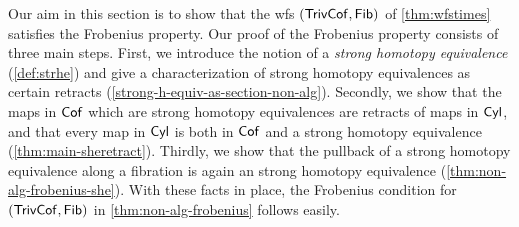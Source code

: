 \documentclass[reqno,10pt,a4paper,oneside,draft]{amsart}
\begin{document}
Our aim in this section is to show that the wfs $(\mathsf{TrivCof}, \mathsf{Fib})$ of \cref{thm:wfstimes} satisfies the Frobenius property.
Our proof of the Frobenius property consists of three main steps.
First, we introduce the notion of a \emph{strong homotopy equivalence} (\cref{def:strhe}) and give a characterization of strong homotopy equivalences as certain retracts (\cref{strong-h-equiv-as-section-non-alg}).
Secondly, we show that the maps in $\mathsf{Cof}$ which are strong homotopy equivalences are retracts of maps in $\mathsf{Cyl}$, and that every map in $\mathsf{Cyl}$ is both in $\mathsf{Cof}$ and a strong homotopy
equivalence (\cref{thm:main-sheretract}).
Thirdly, we show that the pullback of a strong homotopy equivalence along a fibration is again an strong homotopy equivalence (\cref{thm:non-alg-frobenius-she}).
With these facts in place, the Frobenius condition for $(\mathsf{TrivCof}, \mathsf{Fib})$ in \cref{thm:non-alg-frobenius} follows easily.
\end{document}
